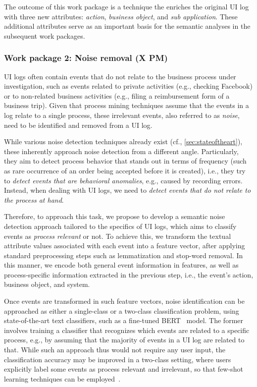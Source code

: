  The outcome of this work package is a technique the enriches the original UI log with three new attributes: \textit{action}, \textit{business object}, and \textit{sub application}. These additional attributes serve as an important basis for the semantic analyses in the subsequent work packages.  


\subsubsection{Work package 2:  Noise removal (X PM)}
\label{sec:wp2}

UI logs often contain events that do not relate to the business process under investigation, such as events related to private activities (e.g., checking Facebook) or to non-related business activities (e.g., filing a reimbursement form of a business trip).
Given that process mining techniques assume that the events in a log relate to a single process, these irrelevant events, also referred to as \emph{noise}, need to be identified and removed from a UI log.

While various noise detection techniques already exist (cf., \autoref{sec:stateoftheart}), these  inherently approach noise detection from a different angle. Particularly, they aim to detect process behavior that stands out in terms of frequency (such as rare occurrence of an order being accepted before it is created), i.e., they try to \emph{detect events that are behavioral anomalies}, e.g., caused by recording errors.
Instead, when dealing with UI logs, we need to \emph{detect events that do not relate to the process at hand}. 

Therefore, to approach this task, we propose to develop a semantic noise detection approach tailored to the specifics of UI logs, which aims to classify events as \emph{process relevant} or not. 
To achieve this, we transform the textual attribute values associated with each event into a feature vector, after applying standard preprocessing steps such as lemmatization and stop-word removal. In this manner, we encode both general event information in features, as well as process-specific information extracted in the previous step, i.e., the event's action, business object, and system.

Once events are transformed in such feature vectors, noise identification can be approached as either a single-class or a two-class classification problem, using state-of-the-art text classifiers, such as a fine-tuned BERT~\cite{Devlin2019} model. The former involves training a classifier that recognizes which events are related to a specific process, e.g., by assuming that the majority of events in a UI log are related to that. While such an approach thus would not require any user input, the classification accuracy may be improved in a two-class setting, where users explicitly label some events as process relevant and irrelevant, so that few-shot learning techniques can be employed~\cite{yu2018diverse}.

